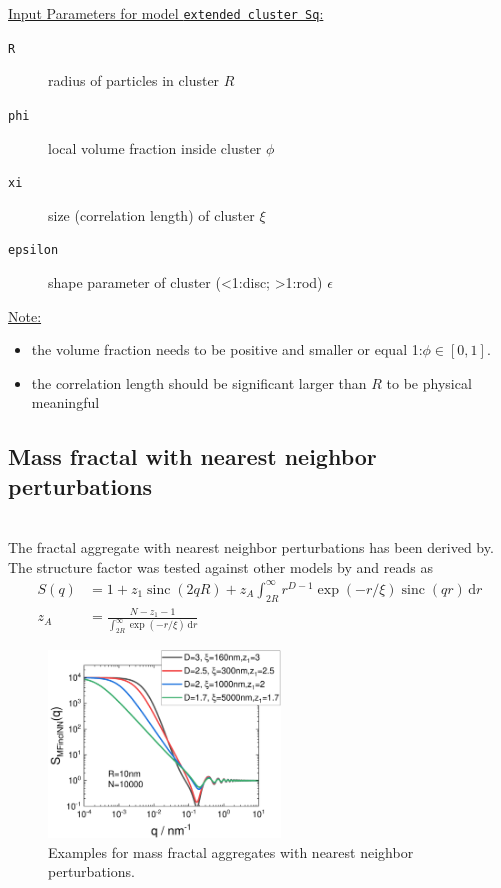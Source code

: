 \noindent \uline{Input Parameters for model \texttt{extended cluster Sq}:}
\begin{description}
\item[\texttt{R}] radius of particles in cluster $R$
\item[\texttt{phi}] local volume fraction inside cluster $\phi$
\item[\texttt{xi}] size (correlation length) of cluster $\xi$
\item[\texttt{epsilon}] shape parameter of cluster (<1:disc; >1:rod) $\epsilon$
\end{description}


\noindent\uline{Note:}
\begin{itemize}
\item the volume fraction needs to be positive and smaller or equal 1:$\phi\in [0,1]$.
\item the correlation length should be significant larger than $R$ to be physical meaningful
\end{itemize}

\subsection{Mass fractal with nearest neighbor perturbations}~\\
\label{sec:SQmassfractalInclNN}
The fractal aggregate with nearest neighbor perturbations has been derived by\cite{Dimon1986}. The structure factor was tested against other models by \cite{Larsen2020} and reads as
\begin{align}\label{eq:SQmfNN}
  S(q) &= 1+z_1\operatorname{sinc}(2qR) + z_A \int_{2R}^\infty r^{D-1}\exp(-r/\xi)\operatorname{sinc}(qr) \, \mathrm{d}r \\
  z_A &= \frac{N-z_1-1}{\displaystyle \int_{2R}^\infty \exp(-r/\xi) \, \mathrm{d}r}
\end{align}

\begin{figure}[htb]
\begin{center}
\includegraphics[width=0.55\textwidth]{../images/structure_factor/MassFractals/MFinclNN.pdf}
\end{center}
\caption{Examples for mass fractal aggregates with nearest neighbor perturbations.}
\label{fig:SQ_MF_NN}
\end{figure}


